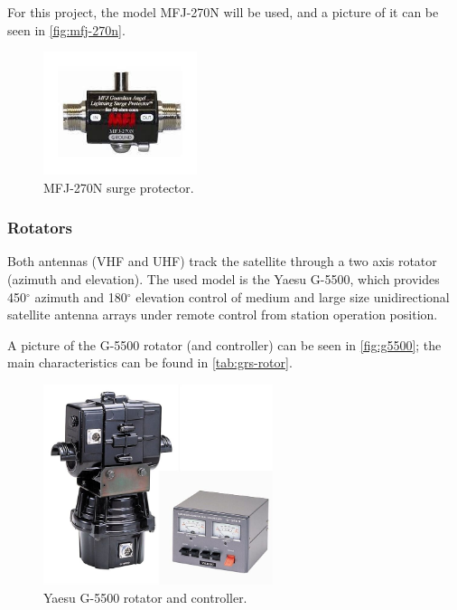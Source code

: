For this project, the model MFJ-270N will be used, and a picture of it can be seen in \autoref{fig:mfj-270n}.

\begin{figure}[!ht]
    \begin{center}
        \includegraphics[width=0.4\textwidth]{figures/mfj-270n.jpeg}
        \caption{MFJ-270N surge protector.}
        \label{fig:mfj-270n}
    \end{center}
\end{figure}

\subsubsection{Rotators}

Both antennas (VHF and UHF) track the satellite through a two axis rotator (azimuth and elevation). The used model is the Yaesu G-5500, which provides 450$^{\circ}$ azimuth and 180$^{\circ}$ elevation control of medium and large size unidirectional satellite antenna arrays under remote control from station operation position.

A picture of the G-5500 rotator (and controller) can be seen in \autoref{fig:g5500}; the main characteristics can be found in \autoref{tab:grs-rotor}.

\begin{figure}[!ht]
    \begin{center}
        \includegraphics[width=0.6\textwidth]{figures/g5500.jpg}
        \caption{Yaesu G-5500 rotator and controller.}
        \label{fig:g5500}
    \end{center}
\end{figure}

